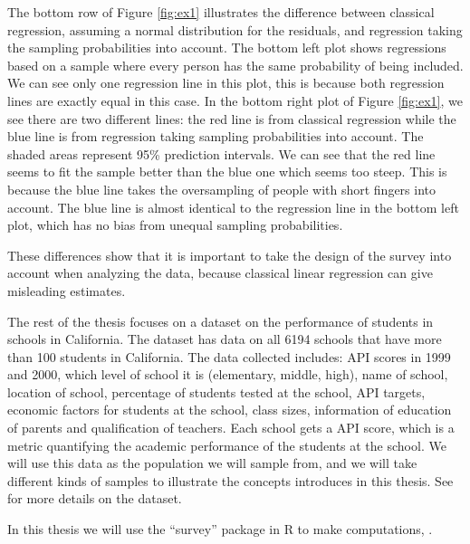 \documentclass{article}
\begin{document}
\begin{example}
The bottom row of Figure \ref{fig:ex1} illustrates the difference between
classical regression, assuming a normal distribution for the residuals,
and regression taking the sampling probabilities into account. The bottom left plot shows regressions based on a
sample where every person has the same probability of being included. We can see
only one regression line in this plot, this is because both regression lines are
exactly equal in this case. In the bottom right plot of Figure \ref{fig:ex1}, we
see there are two different lines: the red line is from
classical regression while the blue line is from regression taking sampling
probabilities into account. The shaded areas represent 95\%
prediction intervals. We can see that the red line seems to fit the sample
better than the blue one which seems too steep. This is because the
blue line takes the oversampling of people with short fingers into account. The
blue line is almost identical to the regression line in the bottom left plot,
which has no bias from unequal sampling probabilities.

These differences show that it is important to take the design of the survey
into account when analyzing the data, because classical linear regression can
give misleading estimates.
\end{example}

The rest of the thesis focuses on a dataset on the performance of students in schools in
California. The dataset has data on all 6194 schools that have more than 100
students in California. The data collected
includes: API scores in 1999 and 2000, which level of school it is
(elementary, middle, high), name of school, location of school, percentage of
students tested at the school, API targets, economic factors for students at the
school, class sizes, information of education of parents and qualification of teachers.
Each school gets a API score, which is a metric quantifying the academic performance of the students at the school.
We will use this data as the population we will sample from, and we will take
different kinds of samples to illustrate the concepts introduces in this thesis. See
\cite[Section 1.2]{complexR} for more details on the dataset.

In this thesis we will use the ``survey'' package in R to make computations, \cite{surveyR}.
\end{document}
